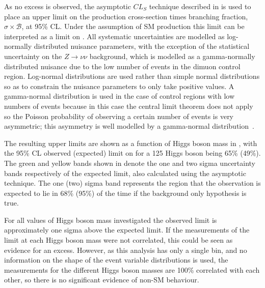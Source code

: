 As no excess is observed, the asymptotic $CL_{S}$ technique described in  is used to place an upper limit on the production cross-section times branching fraction, $\sigma\times\mathcal{B}$, at 95\% \ac{CL}. Under the assumption of \ac{SM} production this limit can be interpreted as a limit on \BRinv. All systematic uncertainties are modelled as log-normally distributed nuisance parameters, with the exception of the statistical uncertainty on the $Z\rightarrow\nu\nu$ background, which is modelled as a gamma-normally distributed nuisance due to the low number of events in the dimuon control region. Log-normal distributions are used rather than simple normal distributions so as to constrain the nuisance parameters to only take positive values. A gamma-normal distribution is used in the case of control regions with low numbers of events because in this case the central limit theorem does not apply so the Poisson probability of observing a certain number of events is very asymmetric; this asymmetry is well modelled by a gamma-normal distribution~\cite{2003sppp.conf...35L}.

The resulting upper limits are shown as a function of Higgs boson mass in , with the 95\% \ac{CL} observed (expected) limit on \BRinv for a 125 \GeV Higgs boson being 65\% (49\%). The green and yellow bands shown in  denote the one and two sigma uncertainty bands respectively of the expected limit, also calculated using the asymptotic technique. The one (two) sigma band represents the region that the observation is expected to lie in 68\% (95\%) of the time if the background only hypothesis is true.

For all values of Higgs boson mass investigated the observed limit is approximately one sigma above the expected limit. If the measurements of the limit at each Higgs boson mass were not correlated, this could be seen as evidence for an excess. However, as this analysis has only a single bin, and no information on the shape of the event variable distributions is used, the measurements for the different Higgs boson masses are 100\% correlated with each other, so there is no significant evidence of non-\ac{SM} behaviour.

